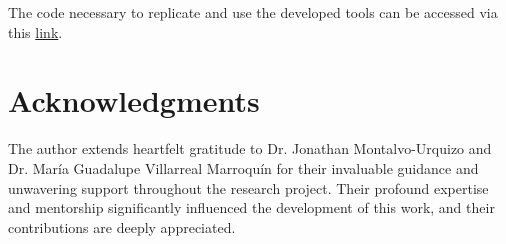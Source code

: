 \documentclass{IEEEtran}
\begin{document}
        The code necessary to replicate and use the developed tools can be accessed via this \href{https://github.com/JuanEcheagaray75/tec_research_predictive_maintenance}{link}.

    \section{Acknowledgments} \label{sec:acknowledgments}

        The author extends heartfelt gratitude to Dr. Jonathan Montalvo-Urquizo and Dr. María Guadalupe Villarreal Marroquín for their invaluable guidance and unwavering support throughout the research project. Their profound expertise and mentorship significantly influenced the development of this work, and their contributions are deeply appreciated.

    
    
\end{document}
